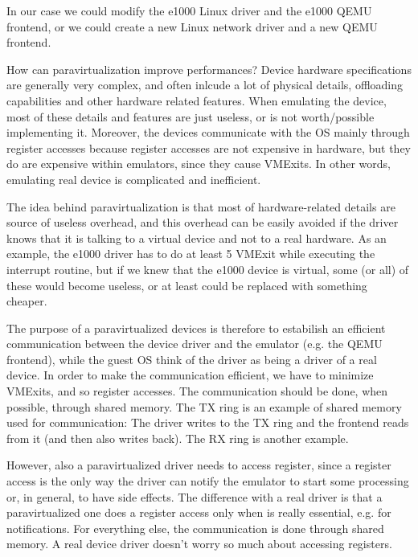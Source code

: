 In our case we could modify the e1000 Linux driver and the e1000 QEMU frontend, or we could create a new Linux network driver and
a new QEMU frontend.

\vspace{0.5cm}

How can paravirtualization improve performances? Device hardware specifications are generally very complex, and often
inlcude a lot of physical details, offloading capabilities and other hardware related features. When emulating the device, most of these 
details and features are just useless, or is not worth/possible implementing it. Moreover, the devices communicate with the OS mainly 
through register accesses because register accesses are not expensive in hardware, but they do are expensive within emulators, since
they cause VMExits. In other words, emulating real device is complicated and inefficient.

\vspace{0.5cm}

The idea behind paravirtualization is that most of hardware-related details are source of useless overhead, and this overhead can be 
easily avoided if the driver knows that it is talking to a virtual device and not to a real hardware. As an example, the e1000 driver has
to do at least 5 VMExit while executing the interrupt routine, but if we knew that the e1000 device is virtual, some (or all) of these
would become useless, or at least could be replaced with something cheaper.

The purpose of a paravirtualized devices is therefore to estabilish an efficient communication between the device driver and the emulator
(e.g. the QEMU frontend), while the guest OS think of the driver as being a driver of a real device.
In order to make the communication efficient, we have to minimize VMExits, and so register accesses. The communication should be done, when
possible, through shared memory. The TX ring is an example of shared memory used for communication: The driver writes to the TX ring and
the frontend reads from it (and then also writes back). The RX ring is another example.

However, also a paravirtualized driver needs to access register, since a register access is the only way the driver can notify the
emulator to start some processing or, in general, to have side effects. The difference with a real driver is that a paravirtualized one
does a register access only when is really essential, e.g. for notifications. For everything else, the communication is done through
shared memory. A real device driver doesn't worry so much about accessing registers.



